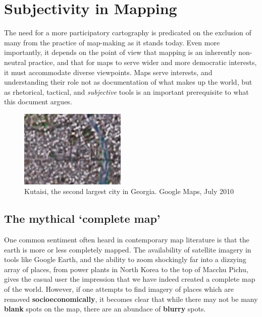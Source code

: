 \documentclass[11pt,oneside,notitlepage]{report}
\begin{document}
\chapter{Subjectivity in Mapping}
\label{chap:subjectivity}

The need for a more participatory cartography is predicated on the exclusion of many from the practice of map-making as it stands today. Even more importantly, it depends on the point of view that mapping is an inherently non-neutral practice, and that for maps to serve wider and more democratic interests, it must accommodate diverse viewpoints. Maps serve interests, and understanding their role not as documentation of what makes up the world, but as rhetorical, tactical, and \emph{subjective} tools is an important prerequisite to what this document argues.

\begin{figure}
	\begin{flushright}
		\includegraphics[width=0.45\textwidth]{images/kutaisi.png}
	\caption{Kutaisi, the second largest city in Georgia. Google Maps, July 2010}
	\end{flushright}
\end{figure}

\section{The mythical `complete map'}

One common sentiment often heard in contemporary map literature is that the earth is more or less completely mapped. The availability of satellite imagery in tools like Google Earth, and the ability to zoom shockingly far into a dizzying array of places, from power plants in North Korea to the top of Macchu Pichu, gives the casual user the impression that we have indeed created a complete map of the world. However, if one attempts to find imagery of places which are removed \textbf{socioeconomically}, it becomes clear that while there may not be many \textbf{blank} spots on the map, there are an abundace of \textbf{blurry} spots. 
\end{document}
